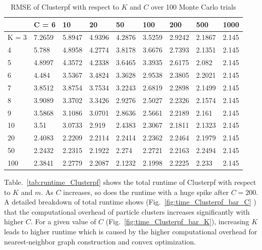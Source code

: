 \documentclass[10pt,letterpaper,final]{article}
\begin{document}
\begin{table}[h!]
\centering
\begin{tabular}{|l|l|l|l|l|l|l|l|l|}
\hline
      & C = 6  & 10     & 20     & 50     & 100    & 200    & 500    & 1000  \\ \hline
K = 3 & 7.2659 & 5.8947 & 4.9396 & 4.2876 & 3.5259 & 2.9242 & 2.1867 & 2.145 \\ \hline
4     & 5.788  & 4.8958 & 4.2774 & 3.8178 & 3.6676 & 2.7393 & 2.1351 & 2.145 \\ \hline
5     & 4.8997 & 4.3572 & 4.2338 & 3.6465 & 3.3935 & 2.6175 & 2.082  & 2.145 \\ \hline
6     & 4.484  & 3.5367 & 3.4824 & 3.3628 & 2.9538 & 2.3805 & 2.2021 & 2.145 \\ \hline
7     & 3.8512 & 3.8754 & 3.7534 & 3.2243 & 2.6819 & 2.2898 & 2.1499 & 2.145 \\ \hline
8     & 3.9089 & 3.3702 & 3.3426 & 2.9276 & 2.5027 & 2.2326 & 2.1574 & 2.145 \\ \hline
9     & 3.5868 & 3.1086 & 3.0701 & 2.8636 & 2.5661 & 2.2189 & 2.161  & 2.145 \\ \hline
10    & 3.51   & 3.0733 & 2.919  & 2.4383 & 2.3067 & 2.1811 & 2.1323 & 2.145 \\ \hline
20    & 2.4083 & 2.2209 & 2.2114 & 2.2414 & 2.2362 & 2.2464 & 2.1979 & 2.145 \\ \hline
50    & 2.2432 & 2.2315 & 2.1922 & 2.274  & 2.2721 & 2.2163 & 2.2494 & 2.145 \\ \hline
100   & 2.3841 & 2.2779 & 2.2087 & 2.1232 & 2.1998 & 2.2225 & 2.233  & 2.145 \\ \hline
\end{tabular}
\caption{RMSE of Clusterpf with respect to $K$ and $C$ over 100 Monte Carlo trials}
\label{tab:RMSE_clusterpf}
\end{table}

Table.~\ref{tab:runtime_Clusterpf} shows the total runtime of Clusterpf with respect to $K$ and $m$. As $C$ increases, so does the runtime with a huge spike after $C=200$. A detailed breakdown of total runtime shows (Fig.~\ref{fig:time_Clusterpf_bar_C} ) that the computational overhead of particle clusters increases significantly with higher $C$. For a given value of $C$ (Fig.~\ref{fig:time_Clusterpf_bar_K}), increasing $K$ leads to higher runtime which is caused by the higher computational overhead for nearest-neighbor graph construction and convex optimization. 
\end{document}

